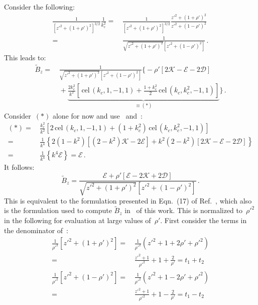 Consider the following:
\begin{align}
      \frac{1}{\left[z'^2 + (1 + \rho')^2\right]^{3/2}} \frac{1}{k_c^2}
 =&\, \frac{1}{\left[z'^2 + (1 + \rho')^2\right]^{3/2}} \frac{z'^2 + (1 + \rho')^2}{z'^2 + (1 - \rho')^2} \nonumber \\
 =&\, \frac{1}{\sqrt{z'^2 + (1 + \rho')^2} \left[z'^2 + (1 - \rho')^2\right]} \, .
\end{align}
This leads to:
\begin{align}
 \tilde{B}_z
 =&\, \frac{1}{\sqrt{z'^2 + (1 + \rho')^2} \left[z'^2 + (1 - \rho')^2\right]} \Biggl\{
      -\rho' \left[ 2 \mathcal{K} - \mathcal{E} - 2 \mathcal{D} \right] \nonumber \\
 ~&\, + \underbrace{\frac{2 k_c^2}{k^2} \left[ \,\textrm{cel}\,(k_c, 1, -1, 1) + \frac{1 + k_c^2}{2} \,\textrm{cel}\,(k_c, k_c^2, -1, 1) \right]}_{\equiv(*)} \Biggr\} \, .
\end{align}
Consider~$(*)$ alone for now and use~ and~:
\begin{align}
  (*)
 =&\, \frac{k_c^2}{k^2} \left[ 2 \,\textrm{cel}\,(k_c, 1, -1, 1) + (1 + k_c^2) \,\textrm{cel}\,(k_c, k_c^2, -1, 1) \right] \nonumber \\
 =&\, \frac{1}{k^4} \left\{ 2(1 - k^2) \left[(2-k^2)\mathcal{K} - 2 \mathcal{E} \right] + k^2 (2 - k^2) \left[2\mathcal{K} - \mathcal{E} - 2 \mathcal{D} \right] \right\} \nonumber \\
 =&\, \frac{1}{k^4} \left\{ k^4 \mathcal{E} \right\} = \mathcal{E} \, . \label{eqn:cwl_B_z_star}
\end{align}
It follows:
\begin{equation}
 \tilde{B}_z
 = \frac{\mathcal{E} + \rho' \left[\mathcal{E} - 2 \mathcal{K} + 2 \mathcal{D} \right]}
        {\sqrt{z'^2 + (1 + \rho')^2} \left[z'^2 + (1 - \rho')^2\right]} \, . \label{eqn:cwl_B_z_f1_appendix}
\end{equation}
This is equivalent to the formulation presented in Eqn.~(17) of Ref.~\cite{walstrom_2017},
which also is the formulation used to compute $\tilde{B}_z$ in~ of this work.
This is normalized to~$\rho'^2$ in the following for evaluation at large values of~$\rho'$.
First consider the terms in the denominator of~:
\begin{align}
  \frac{1}{\rho'^2} \left[ z'^2 + (1 + \rho')^2 \right]
 =&\, \frac{1}{\rho'^2} \left( z'^2 + 1 + 2 \rho' + \rho'^2 \right) \nonumber \\
 =&\, \frac{z'^2 + 1}{\rho'^2} + 1 + \frac{2}{\rho'} = t_1 + t_2 \nonumber \\
 \frac{1}{\rho'^2} \left[ z'^2 + (1 - \rho')^2 \right]
 =&\, \frac{1}{\rho'^2} \left( z'^2 + 1 - 2 \rho' + \rho'^2 \right) \nonumber \\
 =&\, \frac{z'^2 + 1}{\rho'^2} + 1 - \frac{2}{\rho'} = t_1 - t_2
\end{align}
